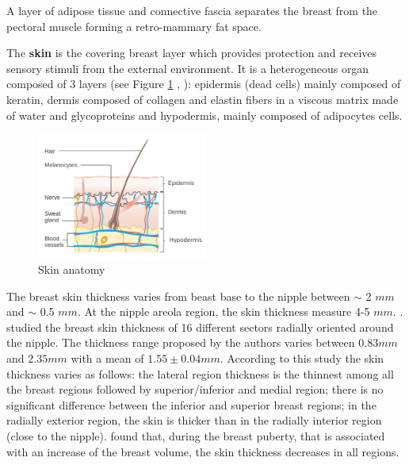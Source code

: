  A layer of adipose tissue and connective fascia separates the breast from the pectoral muscle forming a retro-mammary fat space.
 
The \textbf{skin} is the covering breast layer which provides protection and receives sensory stimuli from the external environment. It is a heterogeneous organ composed of 3 layers (see Figure \ref{fig:skinanatomy} , \citep{kanitakis2002anatomy} ): epidermis (dead cells) mainly composed of keratin, dermis composed of collagen and elastin fibers in a viscous matrix made of water and glycoproteins and hypodermis, mainly composed of adipocytes cells.


\begin{figure}[!h]
\centering
\centerline{\includegraphics[width=0.5\textwidth,keepaspectratio]{figures/skin_2.jpg} }
\caption{Skin anatomy}
\label{fig:skinanatomy}
\end{figure}



The breast skin thickness varies from beast base to the nipple between $\sim$ 2 $mm$ and $\sim$ 0.5 $mm$. At the nipple areola region, the skin thickness measure 4-5 $mm$.
 \citep{andolina2011mammographic}. \cite{sutradhar_vivo_2013} studied the breast skin thickness of 16 different sectors radially oriented around the nipple. The thickness range proposed by the authors varies between $0.83 mm$ and $2.35 mm$ with a mean of $1.55 \pm 0.04 mm$. According to this study the skin thickness varies as follows: the lateral
region thickness is the thinnest among all the breast regions followed by superior/inferior and medial region; there is no significant difference between the inferior and superior breast regions; in the radially exterior region, the skin is thicker than in the radially interior region (close to the nipple).  \cite{ulger2003effect} found that, during the breast puberty, that is associated with an increase of the breast volume, the skin thickness decreases in all regions.

